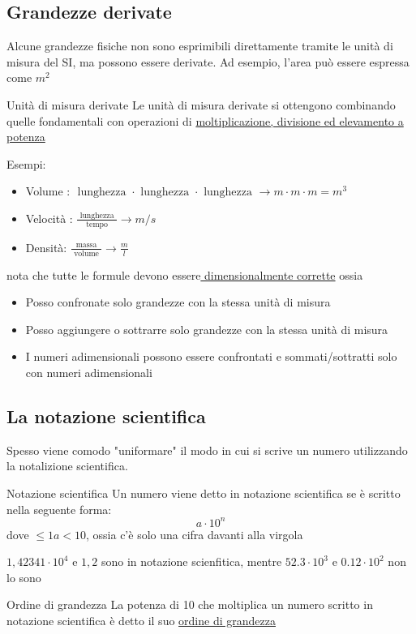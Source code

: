 \subsection{Grandezze derivate}
Alcune grandezze fisiche non sono esprimibili direttamente tramite le unità di misura del SI, ma possono essere derivate. Ad esempio, l'area può essere espressa come $ m^2  $
\begin{definizione}{Unità di misura derivate}
	Le unità di misura derivate si ottengono combinando quelle fondamentali con operazioni di \underline{moltiplicazione, divisione ed elevamento a potenza}
\end{definizione}
Esempi:
\begin{itemize}
	\item Volume : $ \text{ lunghezza } \cdot \text{ lunghezza } \cdot \text{ lunghezza } \rightarrow m \cdot  m \cdot m = m^3  $
	\item Velocità : $ \frac{\text{ lunghezza }}{\text{ tempo }} \rightarrow   m / s $
	\item Densità: $ \frac{\text{ massa }}{\text{ volume }} \rightarrow \frac{m}{l} $
\end{itemize}
nota che tutte le formule devono essere\underline{ dimensionalmente corrette} ossia
\begin{itemize}
	\item Posso confronate solo grandezze con la stessa unità di misura
	\item Posso aggiungere o sottrarre solo grandezze con la stessa unità di misura
	\item I numeri adimensionali possono essere confrontati e sommati/sottratti solo con numeri adimensionali
\end{itemize}
\subsection{La notazione scientifica}
Spesso viene comodo "uniformare" il modo in cui si scrive un numero utilizzando la notalizione scientifica.
\begin{definizione}{Notazione scientifica}
	Un numero viene detto in notazione scientifica se è scritto nella seguente forma:
	\[
		a \cdot 10^n
	\]
	dove $ \le 1 a < 10 $, ossia c'è solo una cifra davanti alla virgola
\end{definizione}
$  1,42341  \cdot  10^4$ e $ 1,2 $ sono in notazione scienfitica, mentre $ 52.3 \cdot 10^3 $ e $ 0.12 \cdot 10^2 $ non lo sono
\begin{definizione}{Ordine di grandezza}
	La potenza di 10 che moltiplica un numero scritto in notazione scientifica è detto il suo \underline{ordine di grandezza}
\end{definizione}
